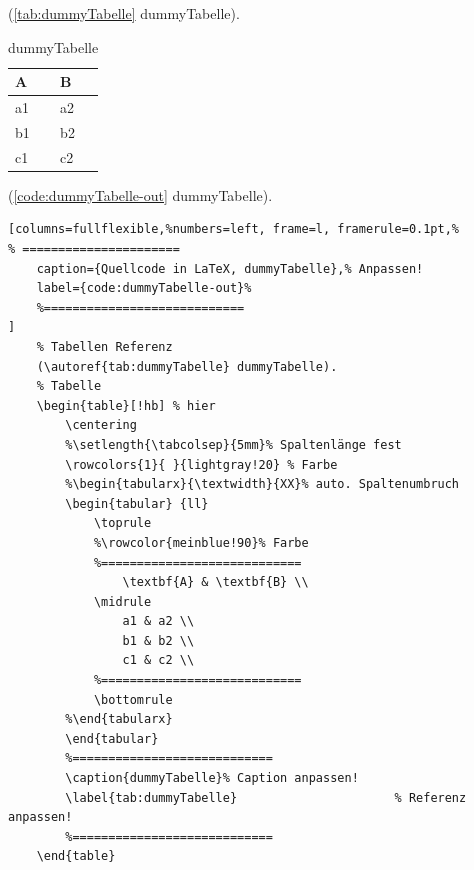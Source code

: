 (\autoref{tab:dummyTabelle} dummyTabelle).
\begin{table}[!hb] %
	\centering
	\begin{tabular} {ll}
		\toprule 
	  \textbf{A} & \textbf{B} \\
	  \midrule
    a1 & a2 \\
    b1 & b2 \\
    c1 & c2 \\
		\bottomrule
	\end{tabular}
	\caption{dummyTabelle}   %
	\label{tab:dummyTabelle} %
\end{table}

(\autoref{code:dummyTabelle-out} dummyTabelle).
\lstset{language=[LaTeX]TeX} %
\begin{lstlisting}[columns=fullflexible,%numbers=left, frame=l, framerule=0.1pt,%
% ======================
	caption={Quellcode in LaTeX, dummyTabelle},% Anpassen!
	label={code:dummyTabelle-out}%
	%============================
]
	% Tabellen Referenz
	(\autoref{tab:dummyTabelle} dummyTabelle).
	% Tabelle
	\begin{table}[!hb] % hier
		\centering
		%\setlength{\tabcolsep}{5mm}% Spaltenlänge fest
		\rowcolors{1}{ }{lightgray!20} % Farbe
		%\begin{tabularx}{\textwidth}{XX}% auto. Spaltenumbruch
		\begin{tabular} {ll}
			\toprule 
			%\rowcolor{meinblue!90}% Farbe
			%============================
				\textbf{A} & \textbf{B} \\
			\midrule
				a1 & a2 \\
				b1 & b2 \\
				c1 & c2 \\
			%============================
			\bottomrule
		%\end{tabularx}
		\end{tabular}
		%============================
		\caption{dummyTabelle}% Caption anpassen!
		\label{tab:dummyTabelle}					  % Referenz anpassen!
		%============================
	\end{table}
\end{lstlisting}

